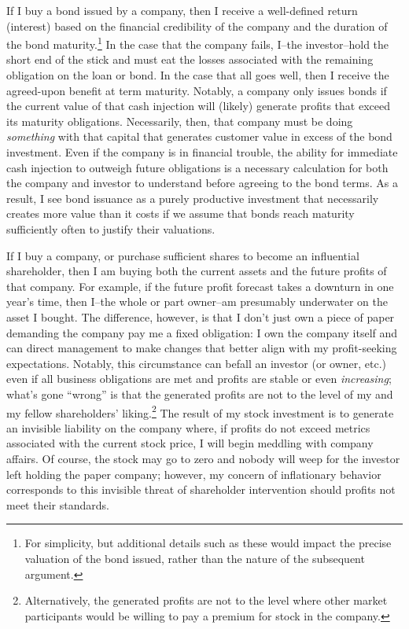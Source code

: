 If I buy a bond issued by a company, then I receive a well-defined return (interest) based on the financial credibility of the company and the duration of the bond maturity.\footnote{For simplicity, but additional details such as these would impact the precise valuation of the bond issued, rather than the nature of the subsequent argument.}  In the case that the company fails, I--the investor--hold the short end of the stick and must eat the losses associated with the remaining obligation on the loan or bond.  In the case that all goes well, then I receive the agreed-upon benefit at term maturity.  Notably, a company only issues bonds if the current value of that cash injection will (likely) generate profits that exceed its maturity obligations.  Necessarily, then, that company must be doing {\it something} with that capital that generates customer value in excess of the bond investment.  Even if the company is in financial trouble, the ability for immediate cash injection to outweigh future obligations is a necessary calculation for both the company and investor to understand before agreeing to the bond terms.  As a result, I see bond issuance as a purely productive investment that necessarily creates more value than it costs if we assume that bonds reach maturity sufficiently often to justify their valuations.  

If I buy a company, or purchase sufficient shares to become an influential shareholder, then I am buying both the current assets and the future profits of that company.  For example, if the future profit forecast takes a downturn in one year's time, then I--the whole or part owner--am presumably underwater on the asset I bought.  The difference, however, is that I don't just own a piece of paper demanding the company pay me a fixed obligation: I own the company itself and can direct management to make changes that better align with my profit-seeking expectations.  Notably, this circumstance can befall an investor (or owner, etc.) even if all business obligations are met and profits are stable or even {\it increasing}; what's gone ``wrong'' is that the generated profits are not to the level of my and my fellow shareholders' liking.\footnote{Alternatively, the generated profits are not to the level where other market participants would be willing to pay a premium for stock in the company.}  The result of my stock investment is to generate an invisible liability on the company where, if profits do not exceed metrics associated with the current stock price, I will begin meddling with company affairs.  Of course, the stock may go to zero and nobody will weep for the investor left holding the paper company; however, my concern of inflationary behavior corresponds to this invisible threat of shareholder intervention should profits not meet their standards.

